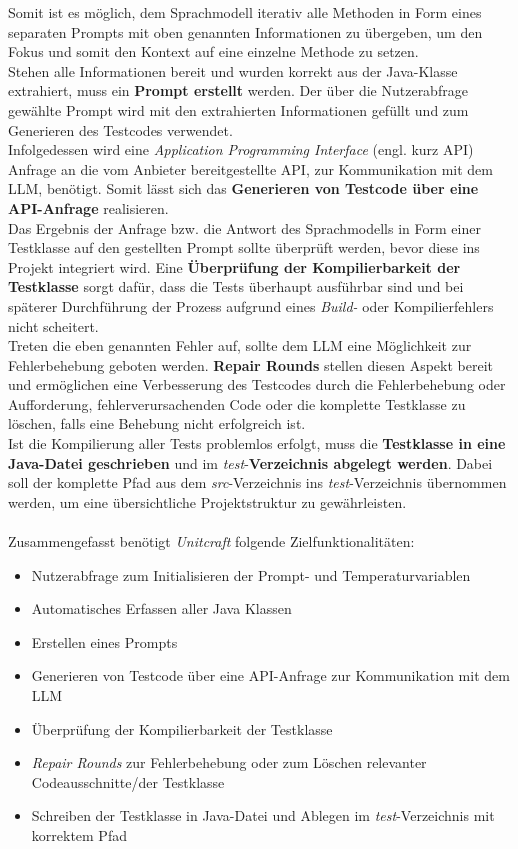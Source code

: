 Somit ist es möglich, dem Sprachmodell iterativ alle Methoden in Form eines separaten Prompts mit oben genannten Informationen zu übergeben, um den Fokus und somit den Kontext auf eine einzelne Methode zu setzen. \\ Stehen alle Informationen bereit und wurden korrekt aus der Java-Klasse extrahiert, muss ein \textbf{Prompt erstellt} werden. Der über die Nutzerabfrage gewählte Prompt wird mit den extrahierten Informationen gefüllt und zum Generieren des Testcodes verwendet.\\ Infolgedessen wird eine \textit{Application Programming Interface} (engl. kurz API) Anfrage an die vom Anbieter bereitgestellte \acs{API}, zur Kommunikation mit dem LLM, benötigt. Somit lässt sich das \textbf{Generieren von Testcode über eine API-Anfrage} realisieren.\\ Das Ergebnis der Anfrage bzw. die Antwort des Sprachmodells in Form einer Testklasse auf den gestellten Prompt sollte überprüft werden, bevor diese ins Projekt integriert wird. Eine \textbf{Überprüfung der Kompilierbarkeit der Testklasse} sorgt dafür, dass die Tests überhaupt ausführbar sind und bei späterer Durchführung der Prozess aufgrund eines \textit{Build-} oder Kompilierfehlers nicht scheitert.\\ Treten die eben genannten Fehler auf, sollte dem LLM eine Möglichkeit zur Fehlerbehebung geboten werden. \textbf{Repair Rounds} stellen diesen Aspekt bereit und ermöglichen eine Verbesserung des Testcodes durch die Fehlerbehebung oder Aufforderung, fehlerverursachenden Code oder die komplette Testklasse zu löschen, falls eine Behebung nicht erfolgreich ist. \\ Ist die Kompilierung aller Tests problemlos erfolgt, muss die \textbf{Testklasse in eine Java-Datei geschrieben} und im \textit{test}-\textbf{Verzeichnis abgelegt werden}. Dabei soll der komplette Pfad aus dem \textit{src}-Verzeichnis ins \textit{test}-Verzeichnis übernommen werden, um eine übersichtliche Projektstruktur zu gewährleisten.\\\\Zusammengefasst benötigt \textit{Unitcraft} folgende Zielfunktionalitäten:
\begin{itemize}
    \setlength{\parskip}{1pt}
    \item Nutzerabfrage zum Initialisieren der Prompt- und Temperaturvariablen
    \item Automatisches Erfassen aller Java Klassen
    \item Erstellen eines Prompts
    \item Generieren von Testcode über eine API-Anfrage zur Kommunikation mit dem LLM
    \item Überprüfung der Kompilierbarkeit der Testklasse
    \item \textit{Repair Rounds} zur Fehlerbehebung oder zum Löschen relevanter Codeausschnitte/der Testklasse
    \item Schreiben der Testklasse in Java-Datei und Ablegen im \textit{test}-Verzeichnis mit korrektem Pfad
\end{itemize}
